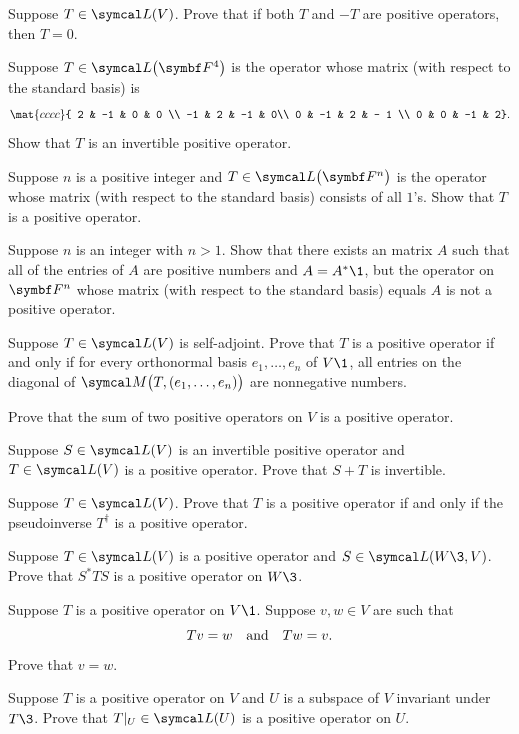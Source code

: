 \begin{exercises}

\exercise
Suppose $T \in \L(V)$. Prove that if both $T$ and $-T$ are positive operators, then $T = 0$.


\exercise
Suppose $T \in \L\paren[\big]{\F4}$ is the operator whose matrix (with respect to the standard basis) is
\[
\mat{cccc}{
2 & -1 & 0 & 0 \\
-1 & 2 & -1 & 0\\
0 & -1 & 2 & - 1 \\
0 & 0 & -1 & 2}.
\]
Show that $T$ is an invertible positive operator.


\exercise
Suppose $n$ is a positive integer and $T \in \L\paren[\big]{\F n}$ is the operator whose matrix (with respect to the standard basis) consists of all $1$'s. Show that $T$ is a positive operator.


\exercise
Suppose $n$ is an integer with $n > 1$. Show that there exists an  matrix $A$ such that all of the entries of $A$ are positive numbers and $A = A^*\1$, but the operator on $\F n$ whose matrix (with respect to the standard basis) equals $A$ is not a positive operator.


\exercise
Suppose $T \in \L(V)$ is self-adjoint. Prove that $T$ is a positive operator if and only if for every orthonormal basis $e_1, \ldots, e_n$ of $V\1$, all entries on the diagonal of $\M\paren[\big]{ T, (e_1, \ldots, e_n) }$ are nonnegative numbers.


\exercise
Prove that the sum of two positive operators on $V$ is a positive operator.


\exercise
Suppose $S \in \L(V)$ is an invertible positive operator and $T \in \L(V)$ is a positive operator. Prove that $S+T$ is invertible.


\exercise
Suppose $T \in \L(V)$. Prove that $T$ is a positive operator if and only if the pseudoinverse $T^\dagger$ is a positive operator.


\exercise
Suppose $T \in \L(V)$ is a positive operator and $S \in \L(W\3, V)$. Prove that $S^* T S$ is a positive operator on $W\3$.


\exercise
Suppose $T$ is a positive operator on $V\1$. Suppose $v, w \in V$ are such that
\[
Tv = w \quad \text{and} \quad Tw = v.
\]
Prove that $v = w$.


\exercise
Suppose $T$ is a positive operator on $V$ and $U$ is a subspace of $V$ invariant under $T\3$. Prove that $T|_U \in \L(U)$ is a positive operator on $U$.



\end{exercises}
